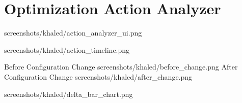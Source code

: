 %
\section{Optimization Action Analyzer}




               {screenshots/khaled/action_analyzer_ui.png}

               {screenshots/khaled/action_timeline.png}

               {Before Configuration Change}
               {screenshots/khaled/before_change.png}
               {After Configuration Change}
               {screenshots/khaled/after_change.png}

               {screenshots/khaled/delta_bar_chart.png}
